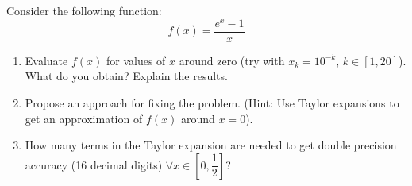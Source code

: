 \documentclass[12pt, a4paper]{report}
\newtheorem[style=M,bodystyle=\normalfont]{theorem}{Theorem}
\newtheorem[style=M,bodystyle=\normalfont]{corollary}{Corollary}
\newtheorem[style=M,bodystyle=\normalfont]{lemma}{Lemma}
\newtheorem[style=M,bodystyle=\normalfont]{definition}{Definition}
\begin{document}
    \begin{Exercise}[label=7]
        Consider the following function:
        \[f(x)=\dfrac{e^x-1}{x}\]
        \begin{enumerate}
            \item Evaluate $f(x)$ for values of $x$ around zero (try with $x_k = 10^{-k}$, $k \in [1, 20]$). What do you obtain? Explain the results.
            \item Propose an approach for fixing the problem. (Hint: Use Taylor expansions to get an approximation of $f(x)$ around $x = 0$). 
            \item How many terms in the Taylor expansion are needed to get double precision accuracy (16 decimal digits) $\forall x \in \left[0, \dfrac{1}{2}\right]$?
        \end{enumerate}
    \end{Exercise}
\end{document}
